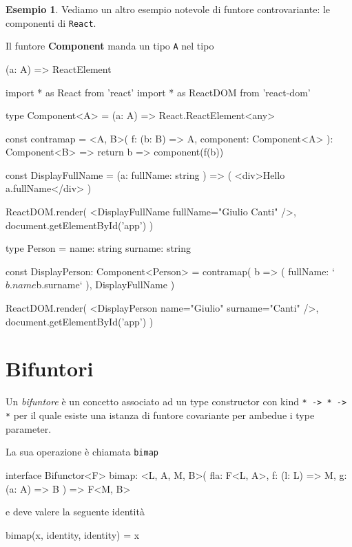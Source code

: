 \documentclass[12pt]{article}
\theoremstyle{definition}
\newtheorem{example}{Esempio}[section]
\newenvironment{code}
  {\vspace{0.5cm} \VerbatimEnvironment\begin{typescriptcode}}
  {\end{typescriptcode} \vspace{0.2cm}}
\begin{document}
\begin{example}
Vediamo un altro esempio notevole di funtore controvariante: le componenti di \texttt{React}.

Il funtore \textbf{Component} manda un tipo \texttt{A} nel tipo

\begin{code}
(a: A) => ReactElement
\end{code}

\begin{code}
import * as React from 'react'
import * as ReactDOM from 'react-dom'

type Component<A> = (a: A) => React.ReactElement<any>

const contramap = <A, B>(
  f: (b: B) => A,
  component: Component<A>
): Component<B> => {
  return b => component(f(b))
}

const DisplayFullName = (a: { fullName: string }) => (
  <div>Hello {a.fullName}</div>
)

ReactDOM.render(
  <DisplayFullName fullName="Giulio Canti" />,
  document.getElementById('app')
)

type Person = {
  name: string
  surname: string
}

const DisplayPerson: Component<Person> = contramap(
  b => ({ fullName: `${b.name} ${b.surname}` }),
  DisplayFullName
)

ReactDOM.render(
  <DisplayPerson name="Giulio" surname="Canti" />,
  document.getElementById('app')
)
\end{code}
\end{example}

\newpage

\section{Bifuntori}

Un \emph{bifuntore} è un concetto associato ad un type constructor con kind \texttt{* -> * -> *}
per il quale esiste una istanza di funtore covariante per ambedue i type parameter.

La sua operazione è chiamata \texttt{bimap}

\begin{code}
interface Bifunctor<F> {
  bimap: <L, A, M, B>(
    fla: F<L, A>,
    f: (l: L) => M,
    g: (a: A) => B
  ) => F<M, B>
}
\end{code}

e deve valere la seguente identità

\begin{code}
bimap(x, identity, identity) = x
\end{code}
\end{document}
